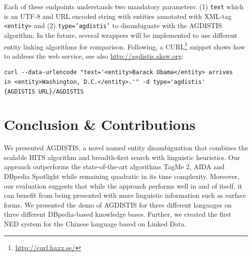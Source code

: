 Each of these endpoints understands two mandatory parameters: (1) \texttt{text} which is an UTF-8 and URL encoded string with entities annotated with XML-tag \texttt{<entity>} and (2) \texttt{type='agdistis'} to disambiguate with the AGDISTIS algorithm.
In the future, several wrappers will be implemented to use different entity linking algorithms for comparison.
Following, a CURL\footnote{\url{http://curl.haxx.se/}} snippet shows how to address the web service, see also \url{http://agdistis.aksw.org}:
\begin{verbatim}
curl --data-urlencode "text='<entity>Barack Obama</entity> arrives 
in <entity>Washington, D.C.</entity>.'" -d type='agdistis' 
{AGDISTIS URL}/AGDISTIS
\end{verbatim}




\section{Conclusion \& Contributions}
\label{sec:conclusion}
We presented AGDISTIS, a novel named entity disambiguation that combines the scalable \ac{HITS} algorithm and breadth-first search with linguistic heuristics.
Our approach outperforms the state-of-the-art algorithms TagMe 2, AIDA and DBpedia Spotlight while remaining quadratic in its time complexity. 
Moreover, our evaluation suggests that while the approach performs well in and of itself, it can benefit from being presented with more linguistic information such as surface forms. 
We presented the demo of AGDISTIS for three different languages on three different DBpedia-based knowledge bases.
Further, we created the first \ac{NED} system for the Chinese language based on Linked Data.

